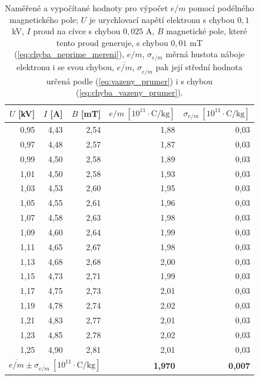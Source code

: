 \documentclass[english]{article}
\begin{document}
\begin{table}[htbp]
  \centering  %
\begin{tabular}{|r|r|r|r|r|}
\hline
\boldmath{}\textbf{$U$ [kV]}\unboldmath{} & \boldmath{}\textbf{$I$ [A]}\unboldmath{} & \boldmath{}\textbf{$B$ [mT]}\unboldmath{} & \boldmath{}\textbf{$e/m~\mathrm{[10^{11}\cdot C/kg]}$}\unboldmath{} & \boldmath{}\textbf{$\sigma_{e/m}~\mathrm{[10^{11}\cdot C/kg]}$}\unboldmath{} \bigstrut\\
\hline
0,95  & 4,43  & 2,54  & 1,88  & 0,03 \bigstrut\\
\hline
0,97  & 4,48  & 2,57  & 1,87  & 0,03 \bigstrut\\
\hline
0,99  & 4,50  & 2,58  & 1,89  & 0,03 \bigstrut\\
\hline
1,01  & 4,50  & 2,58  & 1,93  & 0,03 \bigstrut\\
\hline
1,03  & 4,53  & 2,60  & 1,95  & 0,03 \bigstrut\\
\hline
1,05  & 4,55  & 2,61  & 1,96  & 0,03 \bigstrut\\
\hline
1,07  & 4,58  & 2,63  & 1,98  & 0,03 \bigstrut\\
\hline
1,09  & 4,60  & 2,64  & 1,99  & 0,03 \bigstrut\\
\hline
1,11  & 4,65  & 2,67  & 1,98  & 0,03 \bigstrut\\
\hline
1,13  & 4,68  & 2,68  & 2,00  & 0,03 \bigstrut\\
\hline
1,15  & 4,73  & 2,71  & 1,99  & 0,03 \bigstrut\\
\hline
1,17  & 4,75  & 2,73  & 2,01  & 0,03 \bigstrut\\
\hline
1,19  & 4,78  & 2,74  & 2,02  & 0,03 \bigstrut\\
\hline
1,21  & 4,83  & 2,77  & 2,01  & 0,03 \bigstrut\\
\hline
1,23  & 4,85  & 2,78  & 2,02  & 0,03 \bigstrut\\
\hline
1,25  & 4,90  & 2,81  & 2,01  & 0,03 \bigstrut\\
\hline
\multicolumn{3}{|r|}{\boldmath{}\textbf{$\overline{e/m}\pm\sigma_{\overline{e/m}}~\mathrm{[10^{11}\cdot C/kg]}$}\unboldmath{}} & \textbf{1,970} & \textbf{0,007} \bigstrut\\
\hline
\end{tabular}%

  
      \caption{Naměřené a vypočítané hodnoty pro výpočet $e/m$ pomocí podélného magnetického pole; $U$ je urychlovací napětí elektronu s chybou $0,1$ kV, $I$ proud na cívce s chybou $0,025$ A, $B$ magnetické pole, které tento proud generuje, s chybou $0,01$ mT (\ref{eq:chyba_neprime_mereni}), $e/m$, $\sigma_{e/m}$ měrná hustota náboje elektronu i se svou chybou, $\overline{e/m}$, $\sigma_{\overline{e/m}}$ pak její střední hodnota určená podle (\ref{eq:vazeny_prumer}) i s chybou (\ref{eq:chyba_vazeny_prumer}). }
      
  \label{tab:tab1}%
\end{table}%
\end{document}

